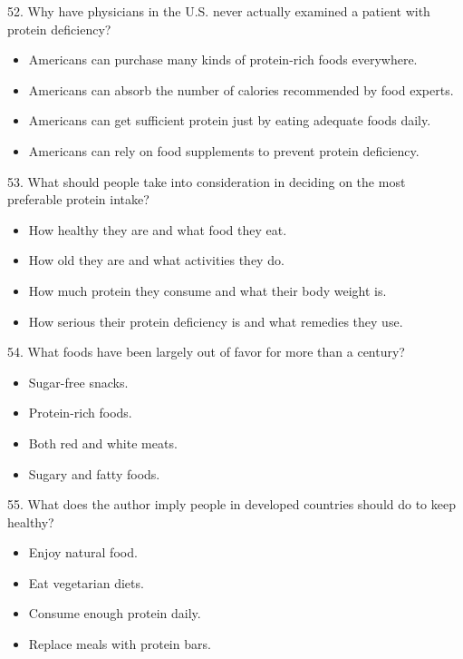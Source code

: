 \documentclass[UTF8,11pt]{ctexart}
\begin{document}
52. Why have physicians in the U.S. never actually examined a patient with protein deficiency?


\begin{itemize}[leftmargin=2em,itemsep=.2em,topsep=.4em]\item[A.] Americans can purchase many kinds of protein-rich foods everywhere.
\item[B.] Americans can absorb the number of calories recommended by food experts.
\item[C.] Americans can get sufficient protein just by eating adequate foods daily.
\item[D.] Americans can rely on food supplements to prevent protein deficiency.
\end{itemize}

53. What should people take into consideration in deciding on the most preferable protein intake?


\begin{itemize}[leftmargin=2em,itemsep=.2em,topsep=.4em]\item[A.] How healthy they are and what food they eat.
\item[B.] How old they are and what activities they do.
\item[C.] How much protein they consume and what their body weight is.
\item[D.] How serious their protein deficiency is and what remedies they use.
\end{itemize}

54. What foods have been largely out of favor for more than a century?


\begin{itemize}[leftmargin=2em,itemsep=.2em,topsep=.4em]\item[A.] Sugar-free snacks.
\item[B.] Protein-rich foods.
\item[C.] Both red and white meats.
\item[D.] Sugary and fatty foods.
\end{itemize}

55. What does the author imply people in developed countries should do to keep healthy?


\begin{itemize}[leftmargin=2em,itemsep=.2em,topsep=.4em]\item[A.] Enjoy natural food.
\item[B.] Eat vegetarian diets.
\item[C.] Consume enough protein daily.
\item[D.] Replace meals with protein bars.
\end{itemize}
\end{document}
